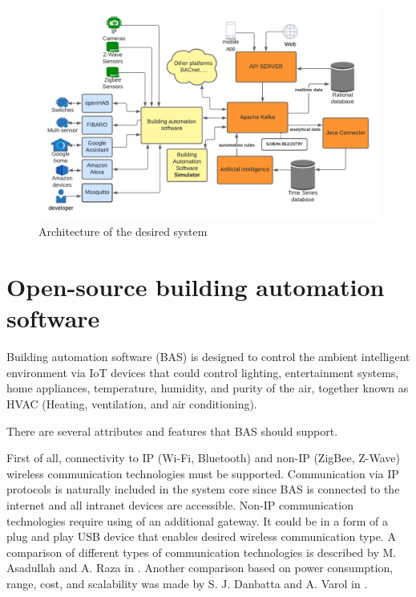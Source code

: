 \documentclass[fleqn,10pt]{olplainarticle}
\begin{document}
\begin{figure}[ht]
    \centering
    \includegraphics[width=1\linewidth]{images/IoT model big picture.png}
    \caption{Architecture of the desired system}
    \label{fig:figure1}
\end{figure}


\section{Open-source building automation software}

Building automation software (BAS) is designed to control the ambient intelligent environment via IoT devices that could control lighting, entertainment systems, home appliances, temperature, humidity, and purity of the air, together known as HVAC (Heating, ventilation, and air conditioning).

\vskip10pt

There are several attributes and features that BAS should support.

\vskip10pt

First of all, connectivity to IP (Wi-Fi, Bluetooth) and non-IP (ZigBee, Z-Wave) wireless communication technologies must be supported. Communication via IP protocols is naturally included in the system core since BAS is connected to the internet and all intranet devices are accessible. Non-IP communication technologies require using of an additional gateway. It could be in a form of a plug and play USB device that enables desired wireless communication type. A comparison of different types of communication technologies is described by M. Asadullah and A. Raza in \cite{Asadullah2016}. Another comparison based on power consumption, range, cost, and scalability was made by S. J. Danbatta and A. Varol in \cite{Danbatta2019}.
\end{document}
